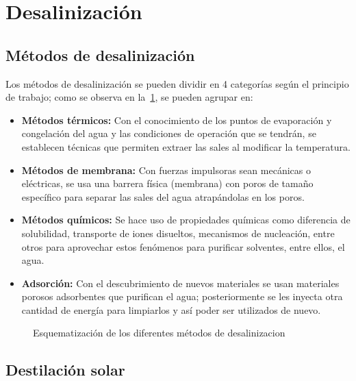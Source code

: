 \section{Desalinización}
	
	\subsection{Métodos de desalinización}
		
		Los métodos de desalinización se pueden dividir en 4 categorías según el principio de trabajo; como se observa en la~\cref{fig:métodos-desalinización}, se pueden agrupar en:
		
		\begin{itemize}
			\item \textbf{Métodos térmicos:} Con el conocimiento de los puntos de evaporación y congelación del agua y las condiciones de operación que se tendrán, se establecen técnicas que permiten extraer las sales al modificar la temperatura.
			\item \textbf{Métodos de membrana:} Con fuerzas impulsoras sean mecánicas o eléctricas, se usa una barrera física (membrana) con poros de tamaño específico para separar las sales del agua atrapándolas en los poros.
			\item \textbf{Métodos químicos:} Se hace uso de propiedades químicas como diferencia de solubilidad, transporte de iones disueltos, mecanismos de nucleación, entre otros para aprovechar estos fenómenos para purificar solventes, entre ellos, el agua.
			\item \textbf{Adsorción:} Con el descubrimiento de nuevos materiales se usan materiales porosos adsorbentes que purifican el agua; posteriormente se les inyecta otra cantidad de energía para limpiarlos y así poder ser utilizados de nuevo.
		\end{itemize}
		
		\begingroup
			\tikzexternaldisable
			\begin{figure}[H]
				\centering
				
				\caption{Esquematización de los diferentes métodos de \gls{desalinizacion}}
				\label{fig:métodos-desalinización}
			\end{figure}
			\tikzexternalenable
		\endgroup
	
	\subsection{Destilación solar}
		
